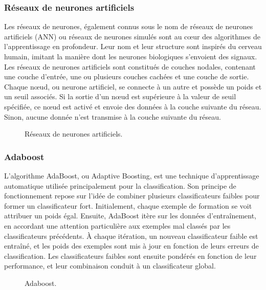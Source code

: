 \subsubsection{Réseaux de neurones artificiels}
Les réseaux de neurones, également connus sous le nom de réseaux de neurones artificiels (ANN) ou réseaux de neurones simulés sont au cœur des algorithmes de l'apprentissage en profondeur. Leur nom et leur structure sont inspirés du cerveau humain, imitant la manière dont les neurones biologiques s'envoient des signaux.
Les réseaux de neurones artificiels sont constitués de couches nodales, contenant une couche d'entrée, une ou plusieurs couches cachées et une couche de sortie. Chaque nœud, ou neurone artificiel, se connecte à un autre et possède un poids et un seuil associés. Si la sortie d'un nœud est supérieure à la valeur de seuil spécifiée, ce nœud est activé et envoie des données à la couche suivante du réseau. Sinon, aucune donnée n'est transmise à la couche suivante du réseau.
\begin{figure}[H]%
    \center%
    \setlength{\fboxsep}{5pt}%
    \setlength{\fboxrule}{0.5pt}%
    \caption{Réseaux de neurones artificiels.}%
\end{figure}

\subsubsection{Adaboost}
L'algorithme AdaBoost, ou Adaptive Boosting, est une technique d'apprentissage automatique utilisée principalement pour la classification. Son principe de fonctionnement repose sur l'idée de combiner plusieurs classificateurs faibles pour former un classificateur fort. Initialement, chaque exemple de formation se voit attribuer un poids égal. Ensuite, AdaBoost itère sur les données d'entraînement, en accordant une attention particulière aux exemples mal classés par les classificateurs précédents. À chaque itération, un nouveau classificateur faible est entraîné, et les poids des exemples sont mis à jour en fonction de leurs erreurs de classification. Les classificateurs faibles sont ensuite pondérés en fonction de leur performance, et leur combinaison conduit à un classificateur global.
\begin{figure}[H]%
    \center%
    \setlength{\fboxsep}{5pt}%
    \setlength{\fboxrule}{0.5pt}%
    \caption{Adaboost.}%
\end{figure}

